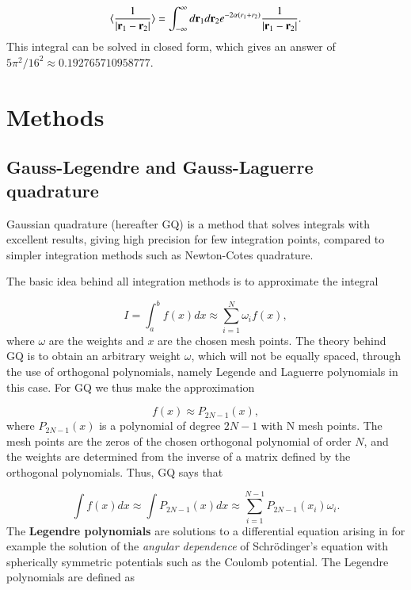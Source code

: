 \documentclass{article}
\begin{document}
\begin{multicols}{2}
\begin{equation}\label{eq:correlationenergy}
	\langle \frac{1}{|{\bf r}_1-{\bf r}_2|} \rangle = \int_{-\infty}^{\infty} d{\bf r}_1d{\bf r}_2  e^{-2\alpha (r_1+r_2)}\frac{1}{|{\bf r}_1-{\bf r}_2|}.
\end{equation}
This integral can be solved in closed form, which gives an answer of $5\pi^2/16^2 \approx 0.192765710958777$.



\section{Methods}

\subsection{Gauss-Legendre and Gauss-Laguerre quadrature}
Gaussian quadrature (hereafter GQ) is a method that solves integrals with excellent results, giving high precision for few integration points, compared to simpler integration methods such as Newton-Cotes quadrature. 

The basic idea behind all integration methods is to approximate the integral

\begin{equation}
	I = \int_a^b f(x) dx \approx \sum_{i = 1}^N \omega_i f(x),
\end{equation}
where $\omega$ are the weights and $x$ are the chosen mesh points. The theory behind GQ is to obtain an arbitrary weight $\omega$, which will not be equally spaced, through the use of orthogonal polynomials, namely Legende and Laguerre polynomials in this case. For GQ we thus make the approximation

\begin{equation}
	f(x) \approx P_{2N-1} (x),
\end{equation}
where $P_{2N-1} (x)$ is a polynomial of degree $2N-1$ with N mesh points. The mesh points are the zeros of the chosen orthogonal polynomial of order $N$, and the weights are determined from the inverse of a matrix defined by the orthogonal polynomials. Thus, GQ says that

\begin{equation}
	\int f(x) dx \approx \int P_{2N-1}(x) dx \approx \sum_{i = 1}^{N-1} P_{2N-1}(x_i) \omega_i.
\end{equation}
The \textbf{Legendre polynomials} are solutions to a differential equation arising in for example the solution of the \textit{angular dependence} of Schr\"{o}dinger's equation with spherically symmetric potentials such as the Coulomb potential. The Legendre polynomials are defined as


\end{multicols}
\end{document}
